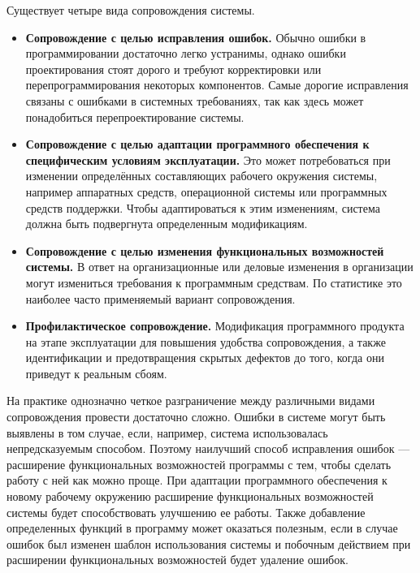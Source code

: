 \documentclass{../../text-style}
\begin{document}
Существует четыре вида сопровождения системы.

\begin{itemize}
    \item \textbf{Сопровождение с целью исправления ошибок.} Обычно ошибки в программировании достаточно легко устранимы, однако ошибки проектирования стоят дорого и требуют корректировки или перепрограммирования некоторых компонентов. Самые дорогие исправления связаны с ошибками в системных требованиях, так как здесь может понадобиться перепроектирование системы.
    \item \textbf{Сопровождение с целью адаптации программного обеспечения к специфическим условиям эксплуатации.} Это может потребоваться при изменении определённых составляющих рабочего окружения системы, например аппаратных средств, операционной системы или программных средств поддержки. Чтобы адаптироваться к этим изменениям, система должна быть подвергнута определенным модификациям.
    \item \textbf{Сопровождение с целью изменения функциональных возможностей системы.} В ответ на организационные или деловые изменения в организации могут измениться требования к программным средствам. По статистике это наиболее часто применяемый вариант сопровождения.
    \item \textbf{Профилактическое сопровождение.} Модификация программного продукта на этапе эксплуатации для повышения удобства сопровождения, а также идентификации и предотвращения скрытых дефектов до того, когда они приведут к реальным сбоям.
\end{itemize}

На практике однозначно четкое разграничение между различными видами сопровождения провести достаточно сложно. Ошибки в системе могут быть выявлены в том случае, если, например, система использовалась непредсказуемым способом. Поэтому наилучший способ исправления ошибок --- расширение функциональных возможностей программы с тем, чтобы сделать работу с ней как можно проще. При адаптации программного обеспечения к новому рабочему окружению расширение функциональных возможностей системы будет способствовать улучшению ее работы. Также добавление определенных функций в программу может оказаться полезным, если в случае ошибок был изменен шаблон использования системы и побочным действием при расширении функциональных возможностей будет удаление ошибок.
\end{document}
